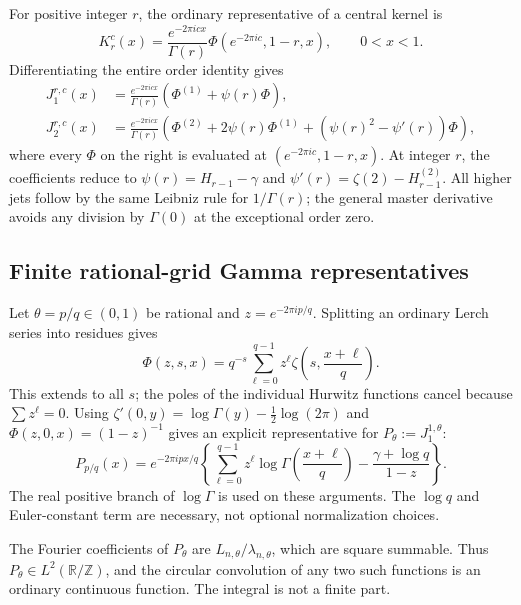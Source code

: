 \documentclass[11pt,a4paper]{article}
\numberwithin{equation}{section}
\theoremstyle{definition}\newtheorem{definition}[theorem]{Definition}
\theoremstyle{remark}\newtheorem{remark}[theorem]{Remark}
\newcommand{\T}{\mathbb R/\mathbb Z}
\begin{document}
For positive integer $r$, the ordinary representative of a central
kernel is
\begin{equation}
 K_r^c(x)=\frac{e^{-2\pi icx}}{\Gamma(r)}
               \Phi(e^{-2\pi ic},1-r,x),\qquad 0<x<1.
 \label{eq:Krrep}
\end{equation}
Differentiating the entire order identity gives
\begin{align}
 J_1^{r,c}(x)&=\frac{e^{-2\pi icx}}{\Gamma(r)}
       \left(\Phi^{(1)}+\psi(r)\Phi\right),\label{eq:J1rep}\\
 J_2^{r,c}(x)&=\frac{e^{-2\pi icx}}{\Gamma(r)}
       \left(\Phi^{(2)}+2\psi(r)\Phi^{(1)}
                    +(\psi(r)^2-\psi'(r))\Phi\right),
 \label{eq:J2rep}
\end{align}
where every $\Phi$ on the right is evaluated at
$(e^{-2\pi ic},1-r,x)$. At integer $r$, the coefficients reduce to
$\psi(r)=H_{r-1}-\gamma$ and
$\psi'(r)=\zeta(2)-H_{r-1}^{(2)}$. All higher jets follow by the same
Leibniz rule for $1/\Gamma(r)$; the general master derivative avoids
any division by $\Gamma(0)$ at the exceptional order zero.

\subsection{Finite rational-grid Gamma representatives}
Let $\theta=p/q\in(0,1)$ be rational and $z=e^{-2\pi ip/q}$. Splitting
an ordinary Lerch series into residues gives
\begin{equation}
 \Phi(z,s,x)=q^{-s}\sum_{\ell=0}^{q-1}
            z^\ell\zeta\left(s,\frac{x+\ell}{q}\right).
 \label{eq:Lerchrational}
\end{equation}
This extends to all $s$; the poles of the individual Hurwitz functions
cancel because $\sum z^\ell=0$. Using
$\zeta'(0,y)=\log\Gamma(y)-\tfrac12\log(2\pi)$ and
$\Phi(z,0,x)=(1-z)^{-1}$ gives an explicit representative for
$P_\theta:=J_1^{1,\theta}$:
\begin{equation}
 P_{p/q}(x)=e^{-2\pi ipx/q}\left\{
   \sum_{\ell=0}^{q-1}z^\ell\log\Gamma\left(\frac{x+\ell}{q}\right)
       -\frac{\gamma+\log q}{1-z}\right\}.
 \label{eq:Pgamma}
\end{equation}
The real positive branch of $\log\Gamma$ is used on these arguments.
The $\log q$ and Euler-constant term are necessary, not optional
normalization choices.

The Fourier coefficients of $P_\theta$ are $L_{n,\theta}/\lambda_{n,\theta}$,
which are square summable. Thus $P_\theta\in L^2(\T)$, and the circular
convolution of any two such functions is an ordinary continuous
function. The integral is not a finite part.
\end{document}
